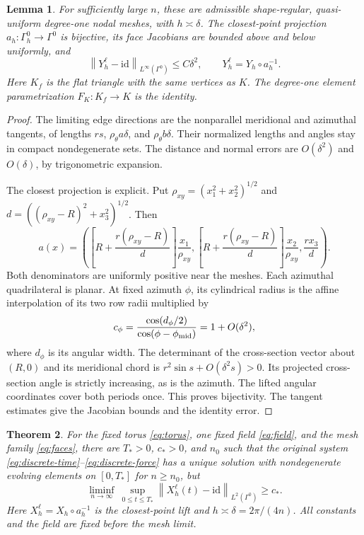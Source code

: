 \documentclass[11pt,a4paper]{article}
\numberwithin{equation}{section}
\newtheorem{theorem}{Theorem}[section]
\newtheorem{lemma}[theorem]{Lemma}
\theoremstyle{remark}
\newcommand{\id}{\mathrm{id}}
\newcommand{\norm}[1]{\left\lVert #1\right\rVert}
\begin{document}
\begin{lemma}\label{lem:admissible}
For sufficiently large \(n\), these are admissible shape-regular,
quasi-uniform degree-one nodal meshes, with \(h\asymp\delta\).
The closest-point projection \(a_h:\Gamma_h^0\to\Gamma^0\) is bijective,
its face Jacobians are bounded above and below uniformly, and
\[
 \norm{Y_h^\ell-\id}_{L^\infty(\Gamma^0)}\leq C\delta^2,
 \qquad Y_h^\ell=Y_h\circ a_h^{-1}.
\]
Here \(K_f\) is the flat triangle with the same vertices as \(K\).
The degree-one element parametrization \(F_K:K_f\to K\) is the identity.
\end{lemma}
\begin{proof}
The limiting edge directions are the nonparallel meridional and
azimuthal tangents, of lengths \(rs\), \(\rho_\theta a\delta\), and
\(\rho_\theta b\delta\). Their normalized lengths and angles stay
in compact nondegenerate sets. The distance and normal errors are
\(O(\delta^2)\) and \(O(\delta)\), by trigonometric expansion.

The closest projection is explicit. Put
\(\rho_{xy}=(x_1^2+x_2^2)^{1/2}\) and
\(d=((\rho_{xy}-R)^2+x_3^2)^{1/2}\). Then
\[
 a(x)=\left(
 \left[R+\frac{r(\rho_{xy}-R)}d\right]\frac{x_1}{\rho_{xy}},
 \left[R+\frac{r(\rho_{xy}-R)}d\right]\frac{x_2}{\rho_{xy}},
 \frac{rx_3}d\right).
\]
Both denominators are uniformly positive near the meshes. Each
azimuthal quadrilateral is planar. At fixed azimuth \(\phi\), its
cylindrical radius is the affine interpolation of its two row radii
multiplied by
\[
 c_\phi=\frac{\cos(d_\phi/2)}{\cos(\phi-\phi_{\rm mid})}
        =1+O(\delta^2),
\]
where \(d_\phi\) is its angular width. The determinant of the
cross-section vector about \((R,0)\) and its meridional chord is
\(r^2\sin s+O(\delta^2s)>0\). Its projected cross-section angle is
strictly increasing, as is the azimuth. The lifted angular coordinates
cover both periods once. This proves bijectivity. The tangent estimates
give the Jacobian bounds and the identity error.
\end{proof}

\begin{theorem}\label{thm:failure}
For the fixed torus \eqref{eq:torus}, one fixed field
\eqref{eq:field}, and the mesh family \eqref{eq:faces}, there are
\(T_*>0\), \(c_*>0\), and \(n_0\) such that the original system
\eqref{eq:discrete-time}--\eqref{eq:discrete-force} has a unique solution
with nondegenerate evolving elements on \([0,T_*]\) for \(n\geq n_0\),
but
\begin{equation}\label{eq:main-failure}
 \liminf_{n\to\infty}\ \sup_{0\leq t\leq T_*}
       \norm{X_h^\ell(t)-\id}_{L^2(\Gamma^0)}\geq c_* .
\end{equation}
Here \(X_h^\ell=X_h\circ a_h^{-1}\) is the closest-point lift and
\(h\asymp\delta=2\pi/(4n)\). All constants and the field are fixed
before the mesh limit.
\end{theorem}
\end{document}

